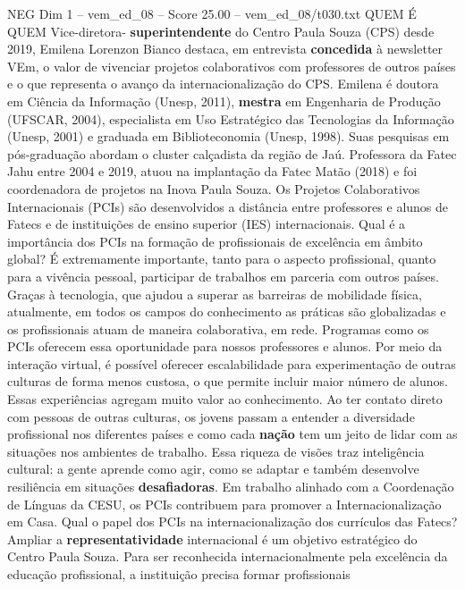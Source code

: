 \begin{textsample}{NEG Dim 1 – vem\_ed\_08 – Score 25.00 – vem\_ed\_08/t030.txt}  \label{ex:f1_neg_125}
QUEM É QUEM Vice-diretora- \textbf{superintendente} do Centro Paula Souza (CPS) desde 2019, Emilena Lorenzon Bianco destaca, em entrevista \textbf{concedida} à newsletter VEm, o valor de vivenciar projetos colaborativos com professores de outros países e o que representa o avanço da internacionalização do CPS.
Emilena é doutora em Ciência da Informação (Unesp, 2011), \textbf{mestra} em Engenharia de Produção (UFSCAR, 2004), especialista em Uso Estratégico das Tecnologias da Informação (Unesp, 2001) e graduada em Biblioteconomia (Unesp, 1998).
Suas pesquisas em pós-graduação abordam o cluster calçadista da região de Jaú.
Professora da Fatec Jahu entre 2004 e 2019, atuou na implantação da Fatec Matão (2018) e foi coordenadora de projetos na Inova Paula Souza.
Os Projetos Colaborativos Internacionais (PCIs) são desenvolvidos a distância entre professores e alunos de Fatecs e de instituições de ensino superior (IES) internacionais.
Qual é a importância dos PCIs na formação de profissionais de excelência em âmbito global?
É extremamente importante, tanto para o aspecto profissional, quanto para a vivência pessoal, participar de trabalhos em parceria com outros países.
Graças à tecnologia, que ajudou a superar as barreiras de mobilidade física, atualmente, em todos os campos do conhecimento as práticas são globalizadas e os profissionais atuam de maneira colaborativa, em rede.
Programas como os PCIs oferecem essa oportunidade para nossos professores e alunos.
Por meio da interação virtual, é possível oferecer escalabilidade para experimentação de outras culturas de forma menos custosa, o que permite incluir maior número de alunos.
Essas experiências agregam muito valor ao conhecimento.
Ao ter contato direto com pessoas de outras culturas, os jovens passam a entender a diversidade profissional nos diferentes países e como cada \textbf{nação} tem um jeito de lidar com as situações nos ambientes de trabalho.
Essa riqueza de visões traz inteligência cultural: a gente aprende como agir, como se adaptar e também desenvolve resiliência em situações \textbf{desafiadoras}.
Em trabalho alinhado com a Coordenação de Línguas da CESU, os PCIs contribuem para promover a Internacionalização em Casa.
Qual o papel dos PCIs na internacionalização dos currículos das Fatecs?
Ampliar a \textbf{representatividade} internacional é um objetivo estratégico do Centro Paula Souza.
Para ser reconhecida internacionalmente pela excelência da educação profissional, a instituição precisa formar profissionais

\end{textsample}
